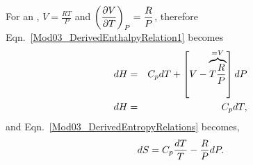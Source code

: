 \medskip

\begin{shaded}
      \noindent
      For an , $V=\frac{RT}{P}$ and $\Partial[V]{T}{P} = \frc{R}{P}$, therefore Eqn.~\ref{Mod03_DerivedEnthalpyRelation1} becomes
         \begin{eqnarray}
            dH &=& C_{p}dT + \left[V-\overbrace{T\frc{R}{P}}^{=V}\right]dP \nonumber \\
            dH &=& C_{p}dT,\label{Mod03_DerivedEnthalpyRelation2}
         \end{eqnarray}
      and Eqn.~\ref{Mod03_DerivedEntropyRelations} becomes,
         \begin{equation}
            dS = C_{p}\frc{dT}{T} -\frc{R}{P}dP.\label{Mod03_DerivedEntropyRelations2}
         \end{equation}
\end{shaded}

\bigskip


